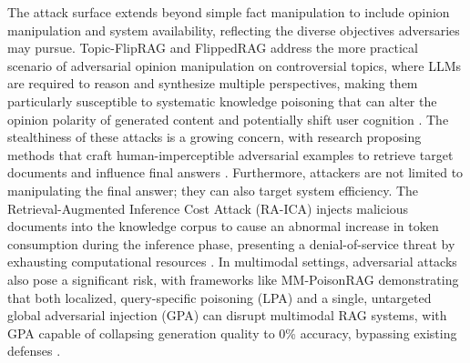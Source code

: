 \documentclass[11pt]{article}
\begin{document}
The attack surface extends beyond simple fact manipulation to include opinion manipulation and system availability, reflecting the diverse objectives adversaries may pursue. Topic-FlipRAG and FlippedRAG address the more practical scenario of adversarial opinion manipulation on controversial topics, where LLMs are required to reason and synthesize multiple perspectives, making them particularly susceptible to systematic knowledge poisoning that can alter the opinion polarity of generated content and potentially shift user cognition \cite{ref432,ref433}. The stealthiness of these attacks is a growing concern, with research proposing methods that craft human-imperceptible adversarial examples to retrieve target documents and influence final answers \cite{ref434}. Furthermore, attackers are not limited to manipulating the final answer; they can also target system efficiency. The Retrieval-Augmented Inference Cost Attack (RA-ICA) injects malicious documents into the knowledge corpus to cause an abnormal increase in token consumption during the inference phase, presenting a denial-of-service threat by exhausting computational resources \cite{ref435}. In multimodal settings, adversarial attacks also pose a significant risk, with frameworks like MM-PoisonRAG demonstrating that both localized, query-specific poisoning (LPA) and a single, untargeted global adversarial injection (GPA) can disrupt multimodal RAG systems, with GPA capable of collapsing generation quality to 0\% accuracy, bypassing existing defenses \cite{ref436}.
\end{document}
